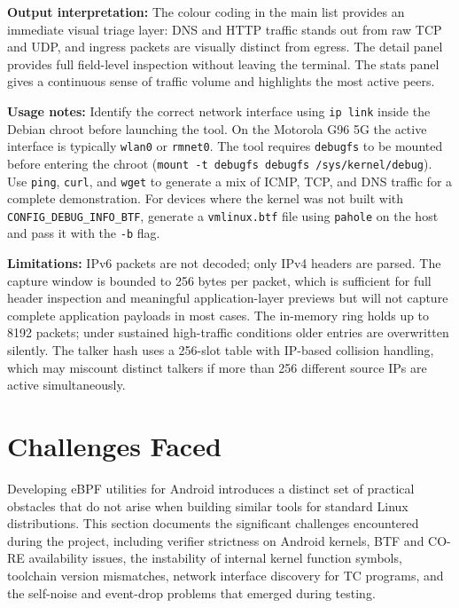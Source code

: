 \documentclass{mnitjaipur}
\begin{document}
\textbf{Output interpretation:} The colour coding in the main list provides an immediate visual triage layer: DNS and HTTP traffic stands out from raw TCP and UDP, and ingress packets are visually distinct from egress. The detail panel provides full field-level inspection without leaving the terminal. The stats panel gives a continuous sense of traffic volume and highlights the most active peers.

\textbf{Usage notes:} Identify the correct network interface using \texttt{ip link} inside the Debian chroot before launching the tool. On the Motorola G96 5G the active interface is typically \texttt{wlan0} or \texttt{rmnet0}. The tool requires \texttt{debugfs} to be mounted before entering the chroot (\texttt{mount -t debugfs debugfs /sys/kernel/debug}). Use \texttt{ping}, \texttt{curl}, and \texttt{wget} to generate a mix of ICMP, TCP, and DNS traffic for a complete demonstration. For devices where the kernel was not built with \texttt{CONFIG\_DEBUG\_INFO\_BTF}, generate a \texttt{vmlinux.btf} file using \texttt{pahole} on the host and pass it with the \texttt{-b} flag.

\textbf{Limitations:} IPv6 packets are not decoded; only IPv4 headers are parsed. The capture window is bounded to 256 bytes per packet, which is sufficient for full header inspection and meaningful application-layer previews but will not capture complete application payloads in most cases. The in-memory ring holds up to 8192 packets; under sustained high-traffic conditions older entries are overwritten silently. The talker hash uses a 256-slot table with IP-based collision handling, which may miscount distinct talkers if more than 256 different source IPs are active simultaneously.

\clearpage
\chapter{Challenges Faced}
Developing eBPF utilities for Android introduces a distinct set of practical obstacles that do not arise when building similar tools for standard Linux distributions. This section documents the significant challenges encountered during the project, including verifier strictness on Android kernels, BTF and CO-RE availability issues, the instability of internal kernel function symbols, toolchain version mismatches, network interface discovery for TC programs, and the self-noise and event-drop problems that emerged during testing.
\end{document}
